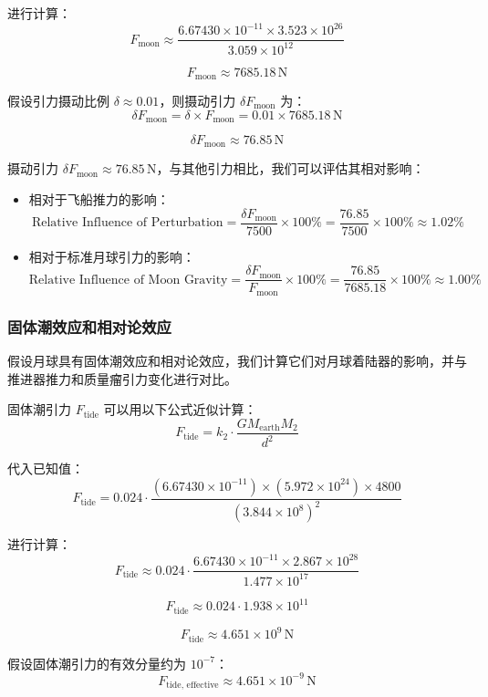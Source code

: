 \documentclass{ctexart}
\begin{document}
进行计算：
\[
F_{\text{moon}} \approx \frac{6.67430 \times 10^{-11} \times 3.523 \times 10^{26}}{3.059 \times 10^{12}}
\]

\[
F_{\text{moon}} \approx 7685.18 \, \text{N}
\]

假设引力摄动比例 \(\delta \approx 0.01\)，则摄动引力 \(\delta F_{\text{moon}}\) 为：
\[
\delta F_{\text{moon}} = \delta \times F_{\text{moon}} = 0.01 \times 7685.18 \, \text{N}
\]

\[
\delta F_{\text{moon}} \approx 76.85 \, \text{N}
\]

摄动引力 \( \delta F_{\text{moon}} \approx 76.85 \, \text{N} \)，与其他引力相比，我们可以评估其相对影响：
\begin{itemize}
	\renewcommand\labelitemi{} %
    \item 相对于飞船推力的影响：
    \[
    \text{Relative Influence of Perturbation} = \frac{\delta F_{\text{moon}}}{7500} \times 100\% = \frac{76.85}{7500} \times 100\% \approx 1.02\%
    \]
    \item 相对于标准月球引力的影响：
    \[
    \text{Relative Influence of Moon Gravity} = \frac{\delta F_{\text{moon}}}{F_{\text{moon}}} \times 100\% = \frac{76.85}{7685.18} \times 100\% \approx 1.00\%
    \]
\end{itemize}

\subsubsection{固体潮效应和相对论效应}
假设月球具有固体潮效应和相对论效应，我们计算它们对月球着陆器的影响，并与推进器推力和质量瘤引力变化进行对比。

固体潮引力 \( F_{\text{tide}} \) 可以用以下公式近似计算：
\[
F_{\text{tide}} = k_2 \cdot \frac{G M_{\text{earth}} M_2}{d^2}
\]

代入已知值：
\[
F_{\text{tide}} = 0.024 \cdot \frac{(6.67430 \times 10^{-11}) \times (5.972 \times 10^{24}) \times 4800}{(3.844 \times 10^8)^2}
\]

进行计算：
\[
F_{\text{tide}} \approx 0.024 \cdot \frac{6.67430 \times 10^{-11} \times 2.867 \times 10^{28}}{1.477 \times 10^{17}}
\]

\[
F_{\text{tide}} \approx 0.024 \cdot 1.938 \times 10^{11}
\]

\[
F_{\text{tide}} \approx 4.651 \times 10^{9} \, \text{N}
\]

假设固体潮引力的有效分量约为 \( 10^{-7} \)：
\[
F_{\text{tide, effective}} \approx 4.651 \times 10^{-9} \, \text{N}
\]
\end{document}
